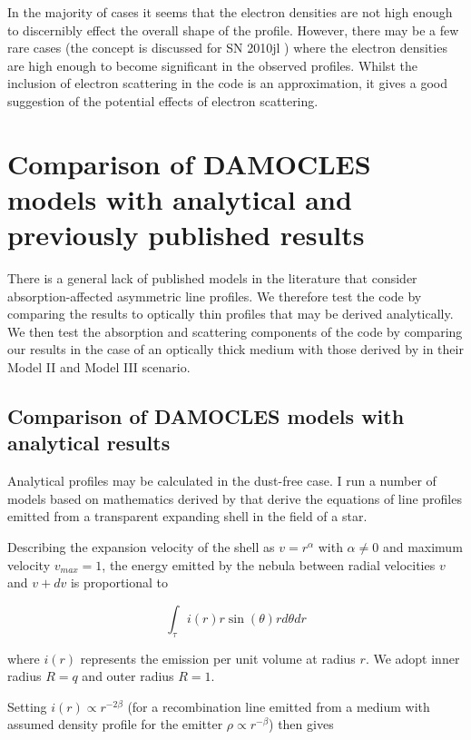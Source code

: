 \documentclass[useAMS,usenatbib,usegraphicx]{mnras}
\begin{document}
In the majority of cases it seems that the electron densities are not high enough to discernibly effect the overall shape of the profile.  However, there may be a few rare cases (the concept is discussed for SN 2010jl \citep{Fransson2013}) where the electron densities are high enough to become significant in the observed profiles.  Whilst the inclusion of electron scattering in the code is an approximation, it gives a good suggestion of the potential effects of electron scattering.


\section{Comparison of DAMOCLES models with analytical and previously published results}
\label{params}
There is a general lack of published models in the literature that consider absorption-affected asymmetric line profiles.  We therefore test the code by comparing the results to optically thin profiles that may be derived analytically.  We then test the absorption and scattering components of the code by comparing our results in the case of an optically thick medium with those derived by \citet{Lucy1989a} in their Model II and Model III scenario. 


\subsection{Comparison of DAMOCLES models with analytical results}
\label{analytics}
Analytical profiles may be calculated in the dust-free case.   I run a number of models based on mathematics derived by \cite{Gerasimovic1933} that derive the equations of line profiles emitted from a transparent expanding shell in the field of a star. 

Describing the expansion velocity of the shell as $v=r^\alpha$ with $\alpha \neq 0$ and maximum velocity $v_{max}=1$, the energy emitted by the nebula between radial velocities $v$ and $v+dv$ is proportional to 

\begin{equation}
\int _\tau i(r) r \sin (\theta) r d\theta dr
\end{equation}

\noindent where $i(r)$ represents the emission per unit volume at radius $r$.  We adopt inner radius $R=q$ and outer radius $R=1$.

Setting $i(r) \propto r^{-2\beta}$ (for a recombination line emitted from a medium with assumed density profile for the emitter $\rho \propto r^{-\beta}$) then gives
\end{document}
